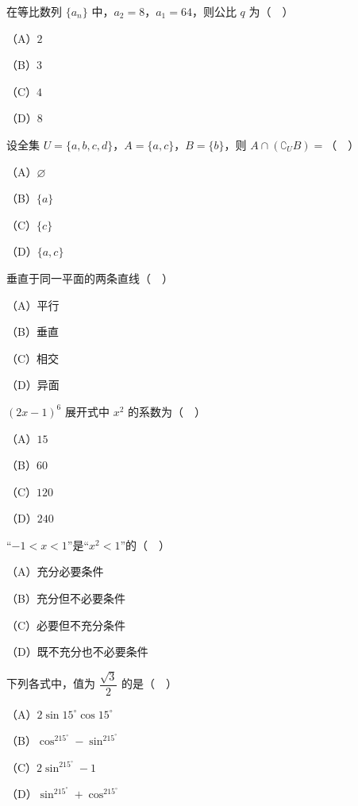 


\begin{question}
在等比数列 $\{a_n\}$ 中，$a_2=8$，$a_1=64$，则公比 $q$ 为（　）

（A）$2$

（B）$3$

（C）$4$

（D）$8$

\end{question}
\begin{question}
设全集 $U=\{a,b,c,d\}$，$A=\{a,c\}$，$B=\{b\}$，则 $A\cap(\complement_UB)=$（　）

（A）$\varnothing$

（B）$\{a\}$

（C）$\{c\}$

（D）$\{a,c\}$

\end{question}
\begin{question}
垂直于同一平面的两条直线（　）

（A）平行

（B）垂直

（C）相交

（D）异面

\end{question}
\begin{question}
$(2x-1)^6$ 展开式中 $x^2$ 的系数为（　）

（A）$15$

（B）$60$

（C）$120$

（D）$240$

\end{question}
\begin{question}
“$-1<x<1$”是“$x^2<1$”的（　）

（A）充分必要条件

（B）充分但不必要条件

（C）必要但不充分条件

（D）既不充分也不必要条件

\end{question}
\begin{question}
下列各式中，值为 $\dfrac{\sqrt3}{2}$ 的是（　）

（A）$2\sin15^\circ\cos15^\circ$

（B）$\cos^215^\circ-\sin^215^\circ$

（C）$2\sin^215^\circ-1$

（D）$\sin^215^\circ+\cos^215^\circ$

\end{question}
